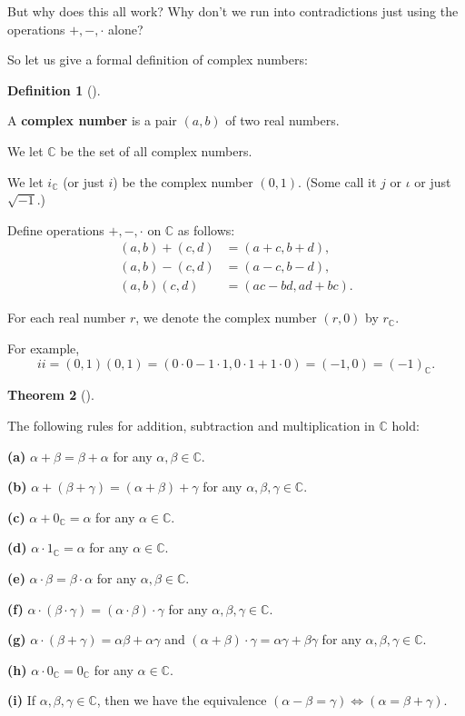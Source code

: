 \documentclass[numbers=enddot,12pt,final,onecolumn,notitlepage]{scrartcl}%
\numberwithin{exer}{subsection}
\theoremstyle{definition}
\newtheorem{theo}{Theorem}[subsection]
\newenvironment{theorem}[1][]
{\begin{theo}[#1]\begin{leftbar}}
{\end{leftbar}\end{theo}}
\newtheorem{defi}[theo]{Definition}
\newenvironment{definition}[1][]
{\begin{defi}[#1]\begin{leftbar}}
{\end{leftbar}\end{defi}}
\begin{document}
But why does this all work? Why don't we run into contradictions just using
the operations $+,-,\cdot$ alone?

So let us give a formal definition of complex numbers:

\begin{definition}
A \textbf{complex number} is a pair $\left(  a,b\right)  $ of two real numbers.

We let $\mathbb{C}$ be the set of all complex numbers.

We let $i_{\mathbb{C}}$ (or just $i$) be the complex number $\left(
0,1\right)  $. (Some call it $j$ or $\iota$ or just $\sqrt{-1}$.)

Define operations $+,-,\cdot$ on $\mathbb{C}$ as follows:%
\begin{align*}
\left(  a,b\right)  +\left(  c,d\right)    & =\left(  a+c,b+d\right)  ,\\
\left(  a,b\right)  -\left(  c,d\right)    & =\left(  a-c,b-d\right)  ,\\
\left(  a,b\right)  \left(  c,d\right)    & =\left(  ac-bd,ad+bc\right)  .
\end{align*}


For each real number $r$, we denote the complex number $\left(  r,0\right)  $
by $r_{\mathbb{C}}$.
\end{definition}

For example,%
\[
ii=\left(  0,1\right)  \left(  0,1\right)  =\left(  0\cdot0-1\cdot
1,0\cdot1+1\cdot0\right)  =\left(  -1,0\right)  =\left(  -1\right)
_{\mathbb{C}}.
\]


\begin{theorem}
\label{thm.CC.CC.rules}The following rules for addition, subtraction and
multiplication in $\mathbb{C}$ hold:

\textbf{(a)} $\alpha+\beta=\beta+\alpha$ for any $\alpha,\beta\in\mathbb{C}$.

\textbf{(b)} $\alpha+\left(  \beta+\gamma\right)  =\left(  \alpha
+\beta\right)  +\gamma$ for any $\alpha,\beta,\gamma\in\mathbb{C}$.

\textbf{(c)} $\alpha+0_{\mathbb{C}}=\alpha$ for any $\alpha\in\mathbb{C}$.

\textbf{(d)} $\alpha\cdot1_{\mathbb{C}}=\alpha$ for any $\alpha\in\mathbb{C}$.

\textbf{(e)} $\alpha\cdot\beta=\beta\cdot\alpha$ for any $\alpha,\beta
\in\mathbb{C}$.

\textbf{(f)} $\alpha\cdot\left(  \beta\cdot\gamma\right)  =\left(  \alpha
\cdot\beta\right)  \cdot\gamma$ for any $\alpha,\beta,\gamma\in\mathbb{C}$.

\textbf{(g)} $\alpha\cdot\left(  \beta+\gamma\right)  =\alpha\beta
+\alpha\gamma$ and $\left(  \alpha+\beta\right)  \cdot\gamma=\alpha
\gamma+\beta\gamma$ for any $\alpha,\beta,\gamma\in\mathbb{C}$.

\textbf{(h)} $\alpha\cdot0_{\mathbb{C}}=0_{\mathbb{C}}$ for any $\alpha
\in\mathbb{C}$.

\textbf{(i)} If $\alpha,\beta,\gamma\in\mathbb{C}$, then we have the
equivalence $\left(  \alpha-\beta=\gamma\right)  \Longleftrightarrow\left(
\alpha=\beta+\gamma\right)  $.
\end{theorem}
\end{document}
